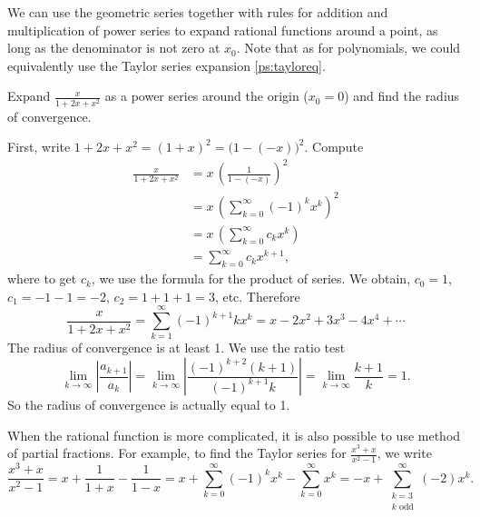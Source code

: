 \documentclass{ximera}
\begin{document}
We can use the geometric series together with rules for addition and multiplication of power series to expand rational functions around a point, as long as the denominator is not zero at $x_0$.  Note that as for polynomials, we could equivalently use the Taylor series expansion \eqref{ps:tayloreq}.

\begin{example}
    Expand $\frac{x}{1+2x+x^2}$ as a power series around the origin ($x_0 = 0$) and find the radius of convergence.
\end{example}

\begin{exampleSol}
    First, write $1+2x+x^2 = {(1+x)}^2 = {\bigl(1-(-x)\bigr)}^2$. Compute
    \begin{equation*}
    \begin{split}
        \frac{x}{1+2x+x^2}
        &= x \, {\left( \frac{1}{1-(-x)} \right)}^2 \\
        &=x \,{ \left( \sum_{k=0}^\infty {(-1)}^k x^k  \right)}^2 \\
        &= x \, \left( \sum_{k=0}^\infty c_k x^k  \right) \\
        &= \sum_{k=0}^\infty c_k x^{k+1} ,
    \end{split}
    \end{equation*}
    where to get $c_k$, we use the formula for the product of series. We obtain, $c_0 = 1$, $c_1 = -1 -1 = -2$, $c_2 = 1+1+1 = 3$, etc. Therefore
    \begin{equation*}
        \frac{x}{1+2x+x^2} = \sum_{k=1}^\infty {(-1)}^{k+1} k x^k = x-2x^2+3x^3-4x^4+\cdots
    \end{equation*}
    The radius of convergence is at least 1.  We use the ratio test
    \begin{equation*}
        \lim_{k\to\infty} \left\lvert \frac{a_{k+1}}{a_k} \right\rvert
        = \lim_{k\to\infty} \left\lvert \frac{{(-1)}^{k+2} (k+1)}{{(-1)}^{k+1}k} \right\rvert
        = \lim_{k\to\infty} \frac{k+1}{k} = 1 .
    \end{equation*}
    So the radius of convergence is actually equal to 1.
\end{exampleSol}

When the rational function is more complicated, it is also possible to use method of partial fractions.  For example, to find the Taylor series for $\frac{x^3+x}{x^2-1}$, we write
\begin{equation*}
    \frac{x^3+x}{x^2-1} = x + \frac{1}{1+x} - \frac{1}{1-x}
    = x + \sum_{k=0}^\infty {(-1)}^k x^k - \sum_{k=0}^\infty x^k
    = - x + \sum_{\substack{k=3 \\ k \text{ odd}}}^\infty (-2) x^k .
\end{equation*}
\end{document}
